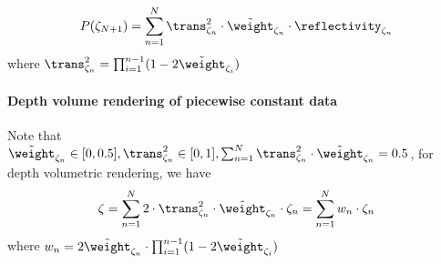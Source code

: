 \begin{align}
P(\zeta_{N+1}) = \sum_{n=1}^N \trans^2_{\zeta_n} \cdot \tilde{\weight}_{\zeta_n} \cdot \reflectivity_{\zeta_n}
\label{eq:final_radiant2}
\end{align}
where $\trans^2_{\zeta_n} = \prod_{i=1}^{n-1}(1-2\tilde{\weight}_{\zeta_i})$


\paragraph{Depth volume rendering of piecewise constant data}

Note that $\tilde{\weight}_{\zeta_n} \in [0, 0.5], \trans^2_{\zeta_n} \in [0,1], \sum_{n=1}^N \trans^2_{\zeta_n} \cdot \tilde{\weight}_{\zeta_n} = 0.5$, for depth volumetric rendering, we have 
\begin{align}
    \zeta = \sum_{n=1}^N 2 \cdot \trans^2_{\zeta_n} \cdot \tilde{\weight}_{\zeta_n} \cdot \zeta_n
    =\sum_{n=1}^N w_n \cdot \zeta_n
    \label{eq:depth_render}
\end{align}
where $w_n = 2\tilde{\weight}_{\zeta_n} \cdot \prod_{i=1}^{n-1}(1-2\tilde{\weight}_{\zeta_i})$